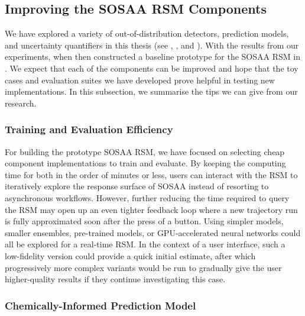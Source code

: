 \subsection{Improving the SOSAA RSM Components}

We have explored a variety of out-of-distribution detectors, prediction models, and uncertainty quantifiers in this thesis (see , , and ). With the results from our experiments, when then constructed a baseline prototype for the SOSAA RSM in . We expect that each of the components can be improved and hope that the toy cases and evaluation suites we have developed prove helpful in testing new implementations. In this subsection, we summarise the tips we can give from our research.

\subsubsection{Training and Evaluation Efficiency}

For building the prototype SOSAA RSM, we have focused on selecting cheap component implementations to train and evaluate. By keeping the computing time for both in the order of minutes or less, users can interact with the RSM to iteratively explore the response surface of SOSAA instead of resorting to asynchronous workflows. However, further reducing the time required to query the RSM may open up an even tighter feedback loop where a new trajectory run is fully approximated soon after the press of a button. Using simpler models, smaller ensembles, pre-trained models, or GPU-accelerated neural networks could all be explored for a real-time RSM. In the context of a user interface, such a low-fidelity version could provide a quick initial estimate, after which progressively more complex variants would be run to gradually give the user higher-quality results if they continue investigating this case.

\subsubsection{Chemically-Informed Prediction Model}

